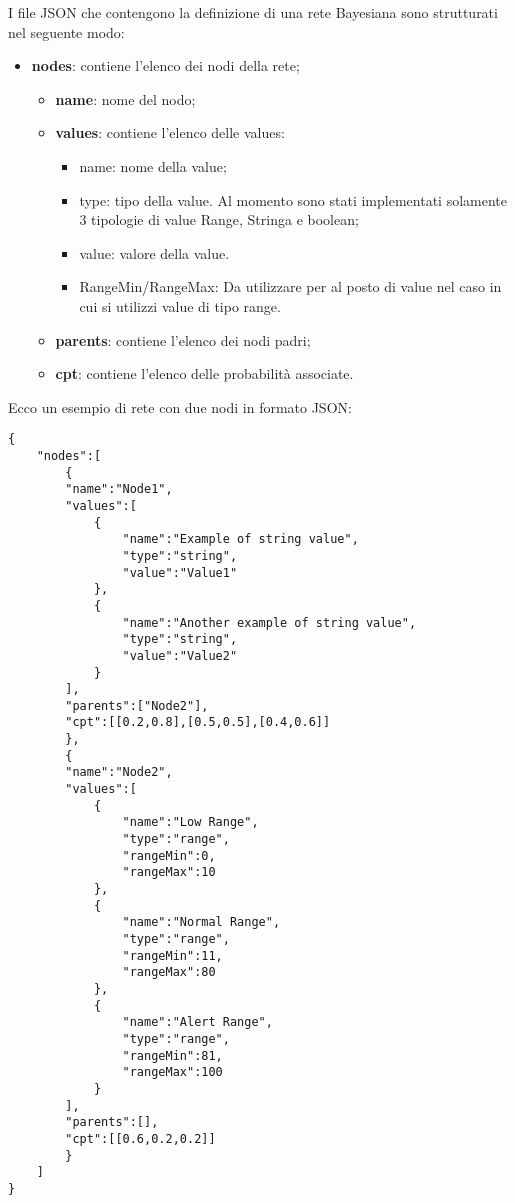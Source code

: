 \pagebreak
{}
I file JSON che contengono la definizione di una rete Bayesiana sono strutturati nel seguente modo:
\begin{itemize}
	\item \textbf{nodes}: contiene l'elenco dei nodi della rete;
	\begin{itemize}
		\item \textbf{name}: nome del nodo;
		\item \textbf{values}: contiene l'elenco delle values:
		\begin{itemize}
			\item name: nome della value;
			\item type: tipo della value. Al momento sono stati implementati solamente 3 tipologie di value Range, Stringa e boolean;
			\item value: valore della value.
			\item RangeMin/RangeMax: Da utilizzare per al posto di value nel caso in cui si utilizzi value di tipo range.
		\end{itemize}
		\item \textbf{parents}: contiene l'elenco dei nodi padri;
		\item \textbf{cpt}: contiene l'elenco delle probabilità associate.
	\end{itemize}
\end{itemize}
\Spazio
Ecco un esempio di rete con due nodi in formato JSON:
\begin{lstlisting}
{
	"nodes":[
		{
		"name":"Node1",
		"values":[
			{
				"name":"Example of string value",
				"type":"string",
				"value":"Value1"
			},
			{
				"name":"Another example of string value",
				"type":"string",
				"value":"Value2"
			}
		],
		"parents":["Node2"],
		"cpt":[[0.2,0.8],[0.5,0.5],[0.4,0.6]]
		},
		{
		"name":"Node2",
		"values":[
			{
				"name":"Low Range",
				"type":"range",
				"rangeMin":0,
				"rangeMax":10
			},
			{
				"name":"Normal Range",
				"type":"range",
				"rangeMin":11,
				"rangeMax":80
			},
			{
				"name":"Alert Range",
				"type":"range",
				"rangeMin":81,
				"rangeMax":100
			}
		],
		"parents":[],
		"cpt":[[0.6,0.2,0.2]]
		}
	]
}
\end{lstlisting}


